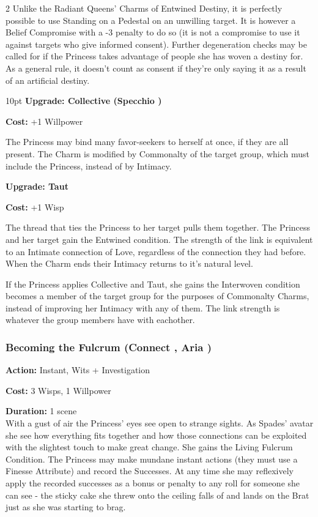 \begin{multicols}{2}
Unlike the Radiant Queens' Charms of Entwined Destiny, it is perfectly possible to use Standing on a Pedestal on an unwilling target. It is however a Belief Compromise with a -3 penalty to do so (it is not a compromise to use it against targets who give informed consent). Further degeneration checks may be called for if the Princess takes advantage of people she has woven a destiny for. As a general rule, it doesn't count as consent if they're only saying it as a result of an artificial destiny.

\begin{myindentpar}{10pt} \textbf{Upgrade: Collective (Specchio \textbullet\textbullet\textbullet\textbullet)}

\noindent \textbf{Cost:} +1 Willpower

The Princess may bind many favor-seekers to herself at once, if they are all present. The Charm is modified by Commonalty of the target group, which must include the Princess, instead of by Intimacy.

\textbf{Upgrade: Taut}

\noindent \textbf{Cost:} +1 Wisp

The thread that ties the Princess to her target pulls them together. The Princess and her target gain the Entwined condition. The strength of the link is equivalent to an Intimate connection of Love, regardless of the connection they had before. When the Charm ends their Intimacy returns to it's natural level.

If the Princess applies Collective and Taut, she gains the Interwoven condition becomes a member of the target group for the purposes of Commonalty Charms, instead of improving her Intimacy with any of them. The link strength is whatever the group members have with eachother.\end{myindentpar}


\subsubsection*{Becoming the Fulcrum (Connect \textbullet\textbullet\textbullet\textbullet\textbullet, Aria \textbullet\textbullet\textbullet\textbullet)}

\noindent \textbf{Action:} Instant, Wits + Investigation

\noindent \textbf{Cost:} 3 Wisps, 1 Willpower

\noindent \textbf{Duration:} 1 scene \\

\noindent With a gust of air the Princess' eyes see open to strange sights. As Spades' avatar she see how everything fits together and how those connections can be exploited with the slightest touch to make great change. She gains the Living Fulcrum Condition. The Princess may make mundane instant actions (they must use a Finesse Attribute) and record the Successes. At any time she may reflexively apply the recorded successes as a bonus or penalty to any roll for someone she can see - the sticky cake she threw onto the ceiling falls of and lands on the Brat just as she was starting to brag. 


\end{multicols}
